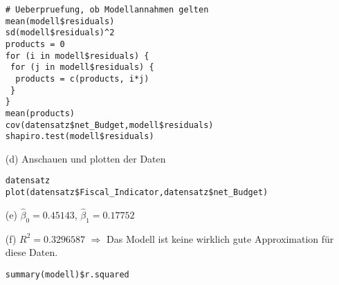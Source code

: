 \documentclass{article}
\begin{document}
\begin{enumerate}[label=(\alph*)]
\begin{lstlisting}[style=R]
# Ueberpruefung, ob Modellannahmen gelten
mean(modell$residuals)
sd(modell$residuals)^2
products = 0
for (i in modell$residuals) {
 for (j in modell$residuals) {
  products = c(products, i*j)
 }
}
mean(products)
cov(datensatz$net_Budget,modell$residuals)
shapiro.test(modell$residuals)
		\end{lstlisting}
		\item[(d)] Anschauen und plotten der Daten
		\begin{lstlisting}[style=R]
datensatz
plot(datensatz$Fiscal_Indicator,datensatz$net_Budget)
		\end{lstlisting}
		\item[(e)] $\hat{\beta}_0 = 0.45143$, $\hat{\beta}_1 = 0.17752$
		\item[(f)] $R^2 = 0.3296587$ $\Rightarrow$ Das Modell ist keine wirklich gute Approximation für diese Daten.
		\begin{lstlisting}[style=R]
summary(modell)$r.squared
		\end{lstlisting}
	\end{enumerate}
	
\end{document}
